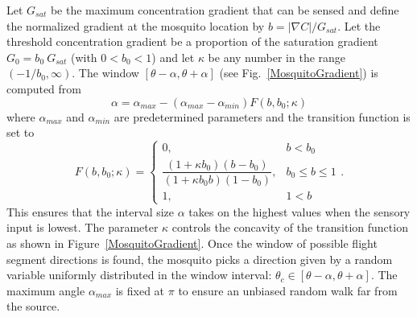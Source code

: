 \documentclass[12pt]{article}
\newif\ifcommentsw
\newcommand{\comment}[1]{\ifcommentsw  $\blacktriangleright$\ \textbf{#1}\ $\blacktriangleleft$ \fi}
\newcommand{\mycaption}[1]{\caption{#1}}
\begin{document}
Let $G_{sat}$ be the maximum concentration gradient that can be
sensed and define the normalized gradient at  the mosquito
location by $b = |\nabla C|/G_{sat}$.  Let the threshold
concentration gradient be a proportion of the saturation
gradient $G_0 = b_0\ G_{sat}$ (with $0<b_0<1$) and let $\kappa$
be any number in the range $(-1/b_0,\infty)$.  The window
$[\theta-\alpha,\theta+\alpha]$ (see
Fig.~\ref{MosquitoGradient}) is computed from
\begin{equation} \label{eqn:response}
\alpha = \alpha_{max} - (\alpha_{max}-\alpha_{min}) F(b,b_0;\kappa)
\end{equation}
where $\alpha_{max}$ and $\alpha_{min}$ are predetermined parameters and the transition function is set to
\begin{equation}
F(b, b_0; \kappa) = \left\{ \begin{array}{lr}
   0, & b < b_0 \\
   \dfrac{(1+\kappa b_0)(b-b_0)}{(1+\kappa b_0 b)(1 - b_0)}, & b_0 \leq b \leq 1 \\
   1, & 1 < b
   \end{array}\right. . \label{eqn:functional}
 \end{equation}
This ensures that the interval size $\alpha$ takes on the highest values when the sensory input is lowest. The parameter $\kappa$ controls the concavity of the transition function as shown in Figure~\ref{MosquitoGradient}.
Once the window of possible flight segment directions is found, the mosquito picks a direction given by a
random variable uniformly distributed in the window interval: $\theta_c \in [\theta-\alpha,\theta+\alpha]$.
The maximum angle $\alpha_{max}$ is fixed at $\pi$ to ensure an unbiased random walk far from the source.

\end{document}
